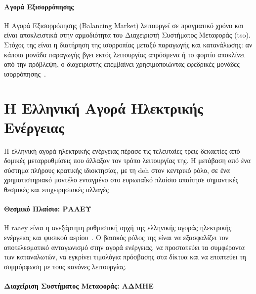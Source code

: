 \paragraph{Αγορά Εξισορρόπησης}

Η Αγορά Εξισορρόπησης (Balancing Market) λειτουργεί σε πραγματικό χρόνο και είναι
αποκλειστικά στην αρμοδιότητα του Διαχειριστή Συστήματος Μεταφοράς (\gls{tso}). Στόχος
της είναι η διατήρηση της ισορροπίας μεταξύ παραγωγής και κατανάλωσης: αν κάποια μονάδα παραγωγής βγει εκτός λειτουργίας απρόσμενα ή το φορτίο
αποκλίνει από την πρόβλεψη, ο διαχειριστής επεμβαίνει χρησιμοποιώντας εφεδρικές
μονάδες ισορρόπησης~\cite{ipto_balancing_market}.


\section{Η Ελληνική Αγορά Ηλεκτρικής Ενέργειας}
\label{sec:greek_market}

Η ελληνική αγορά ηλεκτρικής ενέργειας πέρασε τις τελευταίες τρεις δεκαετίες από
δομικές μεταρρυθμίσεις που άλλαξαν τον τρόπο λειτουργίας της. Η μετάβαση από ένα
σύστημα πλήρους κρατικής ιδιοκτησίας, με τη \gls{deh} στον κεντρικό ρόλο, σε ένα
χρηματιστηριακό μοντέλο ενταγμένο στο ευρωπαϊκό πλαίσιο απαίτησε σημαντικές θεσμικές
και επιχειρησιακές αλλαγές

\paragraph{Θεσμικό Πλαίσιο: ΡΑΑΕΥ}

Η \gls{raaey} είναι η ανεξάρτητη
ρυθμιστική αρχή της ελληνικής αγοράς ηλεκτρικής ενέργειας και φυσικού αερίου~\cite{ypen_target_model_2020}.
Ο βασικός ρόλος της είναι να εξασφαλίζει τον αποτελεσματικό ανταγωνισμό στην αγορά
ενέργειας, να προστατεύει τα συμφέροντα των καταναλωτών, να εγκρίνει τιμολόγια
πρόσβασης στα δίκτυα και να εποπτεύει τη συμμόρφωση με τους κανόνες λειτουργίας.

\paragraph{Διαχείριση Συστήματος Μεταφοράς: ΑΔΜΗΕ}


